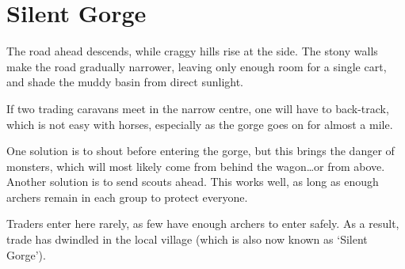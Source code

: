 \section{Silent Gorge}
\label{silentGorge}


\begin{multicols}{2}

\begin{boxtext}
  The road ahead descends, while craggy hills rise at the side.
  The stony walls make the road gradually narrower, leaving only enough room for a single cart, and shade the muddy basin from direct sunlight.
\end{boxtext}

If two trading caravans meet in the narrow centre, one will have to back-track, which is not easy with horses, especially as the gorge goes on for almost a mile.

One solution is to shout before entering the gorge, but this brings the danger of monsters, which will most likely come from behind the wagon\ldots or from above.
Another solution is to send scouts ahead.
This works well, as long as enough archers remain in each group to protect everyone.

Traders enter here rarely, as few have enough archers to enter safely.
As a result, trade has dwindled in the local \gls{village} (which is also now known as `Silent Gorge').

\end{multicols}
